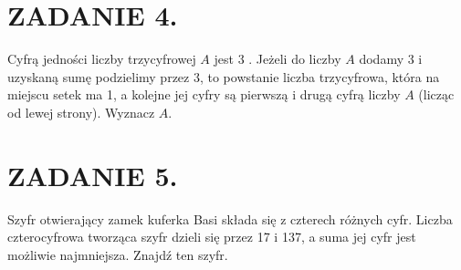 \documentclass[10pt]{article}
\begin{document}
\section*{ZADANIE 4.}
Cyfrą jedności liczby trzycyfrowej \(A\) jest 3 . Jeżeli do liczby \(A\) dodamy 3 i uzyskaną sumę podzielimy przez 3, to powstanie liczba trzycyfrowa, która na miejscu setek ma 1, a kolejne jej cyfry są pierwszą i drugą cyfrą liczby \(A\) (licząc od lewej strony). Wyznacz \(A\).

\section*{ZADANIE 5.}
Szyfr otwierający zamek kuferka Basi składa się z czterech różnych cyfr. Liczba czterocyfrowa tworząca szyfr dzieli się przez 17 i 137, a suma jej cyfr jest możliwie najmniejsza. Znajdź ten szyfr.
\end{document}
